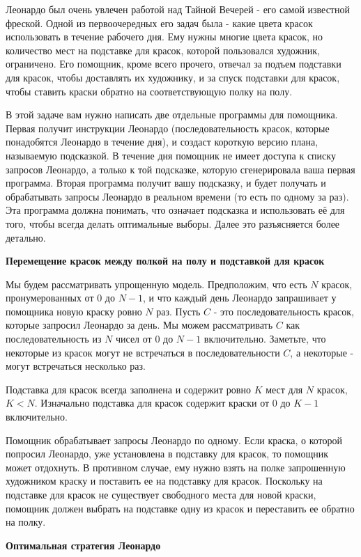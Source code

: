Леонардо был очень увлечен работой над Тайной Вечерей - его самой известной фреской. Одной из первоочередных его задач была - какие цвета красок использовать в течение рабочего дня. Ему нужны многие цвета красок, но количество мест на подставке для красок, которой пользовался художник, ограничено. Его помощник, кроме всего прочего, отвечал за подъем подставки для красок, чтобы доставлять их художнику, и за спуск подставки для красок, чтобы ставить краски обратно на соответствующую полку на полу.

В этой задаче вам нужно написать две отдельные программы для помощника. Первая получит инструкции Леонардо (последовательность красок, которые понадобятся Леонардо в течение дня), и создаст короткую версию плана, называемую подсказкой. В течение дня помощник не имеет доступа к списку запросов Леонардо, а только к той подсказке, которую сгенерировала ваша первая программа. Вторая программа получит вашу подсказку, и будет получать и обрабатывать запросы Леонардо в реальном времени (то есть по одному за раз). Эта программа должна понимать, что означает подсказка и использовать её для того, чтобы всегда делать оптимальные выборы. Далее это разъясняется более детально.

\bf{Перемещение красок между полкой на полу и подставкой для красок}

Мы будем рассматривать упрощенную модель. Предположим, что есть $N$ красок, пронумерованных от $0$ до $N-1$, и что каждый день Леонардо запрашивает у помощника новую краску ровно $N$ раз. Пусть $C$ - это последовательность красок, которые запросил Леонардо за день. Мы можем рассматривать $C$ как последовательность из $N$ чисел от $0$ до $N-1$ включительно. Заметьте, что некоторые из красок могут не встречаться в последовательности $C$, а некоторые - могут встречаться несколько раз.

Подставка для красок всегда заполнена и содержит ровно $K$ мест для $N$ красок, $K < N$. Изначально подставка для красок содержит краски от $0$ до $K-1$ включительно.

Помощник обрабатывает запросы Леонардо по одному. Если краска, о которой попросил Леонардо, уже установлена в подставку для красок, то помощник может отдохнуть. В противном случае, ему нужно взять на полке запрошенную художником краску и поставить ее на подставку для красок. Поскольку на подставке для красок не существует свободного места для новой краски, помощник должен выбрать на подставке одну из красок и переставить ее обратно на полку.

\bf{Оптимальная стратегия Леонардо}

